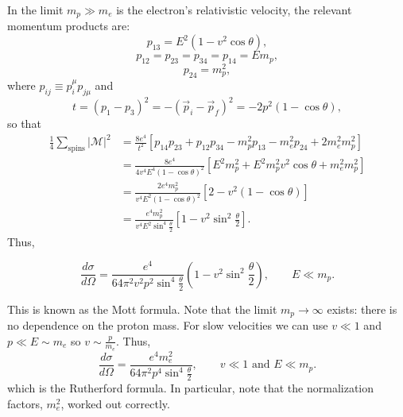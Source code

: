 \documentclass[11pt]{article}
\theoremstyle{definition}
\begin{document}
In the limit $m_p \gg m_e$ is the electron's relativistic velocity, the relevant momentum products are:
\begin{equation}
p_{13}=E^{2}(1-v^{2}\cos\theta),
\end{equation}
\begin{equation}
p_{12}=p_{23}=p_{34}=p_{14}=E m_{p},
\end{equation}
\begin{equation}
p_{24}=m_{p}^{2},
\end{equation}
where $p_{ij}\equiv p_{i}^{\mu}p_{j\mu}$ and
\begin{equation}
t=(p_{1}-p_{3})^{2}=-(\vec{p}_{i}-\vec{p}_{f})^{2}=-2p^{2}(1-\cos\theta),
\end{equation}
so that
\begin{align}
\frac{1}{4}\sum_{\text{spins}}|\mathcal{M}|^{2}
&=\frac{8e^{4}}{t^{2}}[p_{14}p_{23}+p_{12}p_{34}-m_{p}^{2}p_{13}-m_{e}^{2}p_{24}+2m_{e}^{2}m_{p}^{2}] \nonumber \\
&=\frac{8e^{4}}{4v^{4}E^{4}(1-\cos\theta)^{2}}[E^{2}m_{p}^{2}+E^{2}m_{p}^{2}v^{2}\cos\theta+m_{e}^{2}m_{p}^{2}] \nonumber \\
&=\frac{2e^{4}m_{p}^{2}}{v^{4}E^{2}(1-\cos\theta)^{2}}[2-v^{2}(1-\cos\theta)] \nonumber \\
&=\frac{e^{4}m_{p}^{2}}{v^{4}E^{2}\sin^{4}\frac{\theta}{2}}\left[1-v^{2}\sin^{2}\frac{\theta}{2}\right].
\end{align}
Thus,
\begin{shaded}
    \begin{equation}
\frac{d\sigma}{d\Omega}=\frac{e^{4}}{64\pi^{2}v^{2}p^{2}\sin^{4}\frac{\theta}{2}}\left(1-v^{2}\sin^{2}\frac{\theta}{2}\right), \qquad E\ll m_{p}.
\end{equation}
\end{shaded}
This is known as the Mott formula. Note that the limit $m_{p}\rightarrow\infty$ exists: there is no dependence on the proton mass. For slow velocities we can use $v\ll 1$ and $p\ll E\sim m_{e}$ so $v\sim\frac{p}{m_{e}}$. Thus,
\begin{equation}
\frac{d\sigma}{d\Omega}=\frac{e^{4}m_{e}^{2}}{64\pi^{2}p^{4}\sin^{4}\frac{\theta}{2}}, \qquad v\ll 1 \text{ and } E\ll m_{p}.
\end{equation}
which is the Rutherford formula. In particular, note that the normalization factors, $m_{e}^{2}$, worked out correctly.
\end{document}
